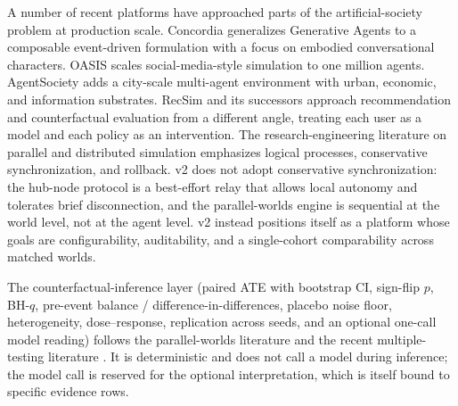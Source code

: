 A number of recent platforms have approached parts of the artificial-society
problem at production scale.  Concordia \citep{vezhnevets2023generative}
generalizes Generative Agents to a composable event-driven formulation with
a focus on embodied conversational characters.  OASIS \citep{yang2024oasis}
scales social-media-style simulation to one million agents.  AgentSociety
\citep{gao2025agentsociety} adds a city-scale multi-agent environment with
urban, economic, and information substrates.  RecSim \citep{ie2019recsim}
and its successors approach recommendation and counterfactual evaluation
from a different angle, treating each user as a model and each policy as an
intervention.  The research-engineering literature on parallel and
distributed simulation \citep{fujimoto2016parallel} emphasizes logical
processes, conservative synchronization, and rollback.  v2 does not adopt
conservative synchronization: the hub-node protocol is a best-effort relay
that allows local autonomy and tolerates brief disconnection, and the
parallel-worlds engine is sequential at the world level, not at the agent
level.  v2 instead positions itself as a platform whose goals are
configurability, auditability, and a single-cohort comparability across
matched worlds.

The counterfactual-inference layer (paired ATE with bootstrap CI, sign-flip
$p$, BH-$q$, pre-event balance / difference-in-differences, placebo noise
floor, heterogeneity, dose--response, replication across seeds, and an
optional one-call model reading) follows the parallel-worlds literature
\citep{pearl2018book,hernan2020causal,rubin2005causal} and the recent
multiple-testing literature \citep{benjamini1995fdr}.  It is deterministic
and does not call a model during inference; the model call is reserved for
the optional interpretation, which is itself bound to specific evidence rows.
